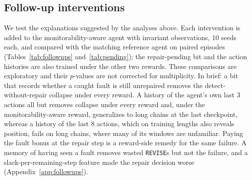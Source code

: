 \subsection{Follow-up interventions}
\label{sec:followups}

We test the explanations suggested by the analyses above. Each intervention is added to the monitorability-aware agent with invariant observations, 10 seeds each, and compared with the matching reference agent on paired episodes (Tables~\ref{tab:followups} and~\ref{tab:pending}); the repair-pending bit and the action histories are also trained under the other two rewards. These comparisons are exploratory and their $p$-values are not corrected for multiplicity. In brief: a bit that records whether a caught fault is still unrepaired removes the detect-without-repair collapse under every reward. A history of the agent's own last 3 actions all but removes collapse under every reward and, under the monitorability-aware reward, generalizes to long chains at the last checkpoint, whereas a history of the last 8 actions, which on training lengths also reveals position, fails on long chains, where many of its windows are unfamiliar. Paying the fault bonus at the repair step is a reward-side remedy for the same failure. A memory of having seen a fault removes wasted \texttt{REVISE}s but not the failure, and a slack-per-remaining-step feature made the repair decision worse (Appendix~\ref{app:followups}).

\begin{table}[t]
\centering
\small
\setlength{\tabcolsep}{3pt}
\caption{Follow-up interventions (mean over 10 seeds, 95\% $t$-interval). ``Last ckpt.'' evaluates the last checkpoint instead of the selected one; ``collapsed'' is the fraction of late checkpoints (after 5{,}000 episodes) with training-length success $\le 0.35$; ``wasted \texttt{REVISE}'' counts non-repair \texttt{REVISE}s per episode at lengths 10--14.}
\label{tab:followups}
\resizebox{\linewidth}{!}{}
\end{table}


